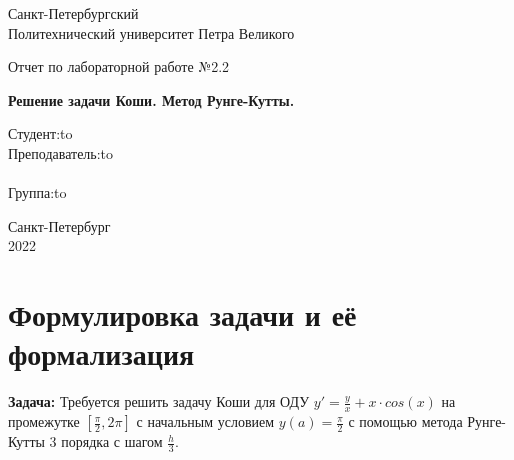 \documentclass[12pt]{article}
\begin{document}
\begin{titlepage}
\Large

\begin{center}
Санкт-Петербургский \\ Политехнический университет Петра Великого

\vspace{10em}

Отчет по лабораторной работе №2.2\\

\vspace{2em}

\textbf{Решение задачи Коши. Метод Рунге-Кутты.}
\end{center}

\vspace{6em}

\newbox{\lbox}
\newlength{\maxl}
\setlength{\maxl}{\wd\lbox}
\hfill\parbox{14cm}{
\hspace*{5cm}\hspace*{-5cm}Студент:\hfill\hbox to\\
\hspace*{5cm}\hspace*{-5cm}Преподаватель:\hfill\hbox to\\
\\
\hspace*{5cm}\hspace*{-5cm}Группа:\hfill\hbox to\\}

\vspace{\fill}
\begin{center}
Санкт-Петербург \\2022
\end{center}
\end{titlepage}

\section{Формулировка задачи и её формализация}
\textbf{Задача:} Требуется решить задачу Коши для ОДУ $y' = \frac{y}{x} + x \cdot cos(x)$ на промежутке $[\frac{\pi}{2}, 2\pi]$ с начальным условием $y(a) = \frac{\pi}{2}$ с помощью метода Рунге-Кутты 3 порядка с шагом $\frac{h}{3}$.
\end{document}
